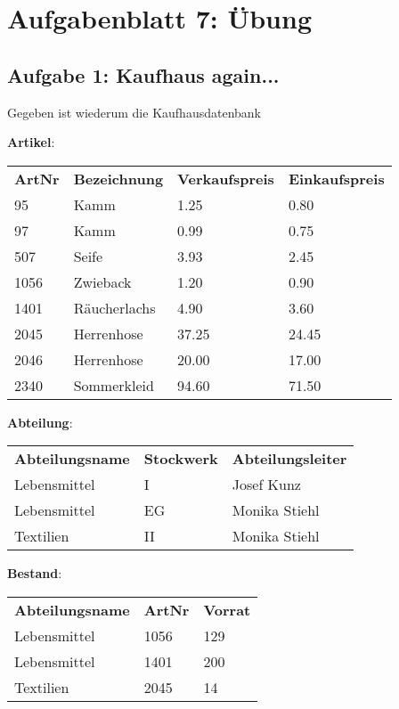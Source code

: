 \documentclass{lehramt-informatik}
\newcommand{\tmptabelle}[1]{
\bigskip
\par
\noindent
\textbf{#1}:
\bigskip
\par
\noindent
}
\begin{document}
\chapter{Aufgabenblatt 7: Übung}

%

\section{Aufgabe 1: Kaufhaus again...}

Gegeben ist wiederum die Kaufhausdatenbank

\tmptabelle{Artikel}

\begin{tabular}{llll}
\textbf{ArtNr} & \textbf{Bezeichnung}  & \textbf{Verkaufspreis} & \textbf{Einkaufspreis} \\
95    & Kamm         & 1.25          & 0.80          \\
97    & Kamm         & 0.99          & 0.75          \\
507   & Seife        & 3.93          & 2.45          \\
1056  & Zwieback     & 1.20          & 0.90          \\
1401  & Räucherlachs & 4.90          & 3.60          \\
2045  & Herrenhose   & 37.25         & 24.45         \\
2046  & Herrenhose   & 20.00         & 17.00         \\
2340  & Sommerkleid  & 94.60         & 71.50
\end{tabular}

\tmptabelle{Abteilung}

\begin{tabular}{lll}
\textbf{Abteilungsname} & \textbf{Stockwerk} & \textbf{Abteilungsleiter} \\
Lebensmittel   & I         & Josef Kunz       \\
Lebensmittel   & EG        & Monika Stiehl    \\
Textilien      & II        & Monika Stiehl
\end{tabular}

\tmptabelle{Bestand}

\begin{tabular}{lll}
\textbf{Abteilungsname}  & \textbf{ArtNr} & \textbf{Vorrat} \\
Lebensmittel    & 1056  & 129    \\
Lebensmittel    & 1401  & 200    \\
Textilien       & 2045  & 14
\end{tabular}
\end{document}

